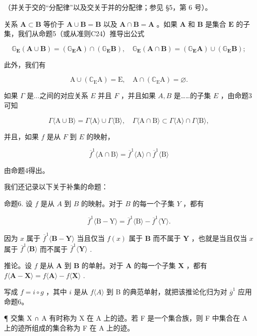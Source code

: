 （并关于交的“分配律”以及交关于并的分配律；参见 §5，第 6 号）。

关系 \(\mathbf{A} \subset \mathbf{B}\) 等价于 \(\mathbf{A} \cup \mathbf{B} = \mathbf{B}\) 以及 \(\mathbf{A} \cap \mathbf{B} = \mathbf{A}\) 。如果 \(\mathbf{A}\) 和 \(\mathbf{B}\) 是集合 \(\mathbf{E}\) 的子集，我们从命题5（或从准则C24）推导出公式

\[
\mathbb {G} _ {\mathbf {E}} (\mathbf {A} \cup \mathbf {B}) = \left(\mathbb {G} _ {\mathbf {E}} \mathbf {A}\right) \cap \left(\mathbb {G} _ {\mathbf {E}} \mathbf {B}\right), \quad \mathbb {G} _ {\mathbf {E}} (\mathbf {A} \cap \mathbf {B}) = \left(\mathbb {G} _ {\mathbf {E}} \mathbf {A}\right) \cup \left(\mathbb {G} _ {\mathbf {E}} \mathbf {B}\right);
\]

此外，我们有

\[
\mathrm{A} \cup (\mathbb {C} _ {\mathrm{E}} \mathrm{A}) = \mathrm{E}, \quad \mathrm{A} \cap (\mathbb {C} _ {\mathrm{E}} \mathrm{A}) = \varnothing .
\]

如果 \(\Gamma\) 是...之间的对应关系 \(E\) 并且 \(F\) ，并且如果 \(A, B\) 是……的子集 \(E\) ，由命题3可知

\[
\Gamma \langle \mathrm{A} \cup \mathrm{B} \rangle = \Gamma \langle \mathrm{A} \rangle \cup \Gamma \langle \mathrm{B} \rangle , \quad \Gamma \langle \mathrm{A} \cap \mathrm{B} \rangle \subset \Gamma \langle \mathrm{A} \rangle \cap \Gamma \langle \mathrm{B} \rangle ,
\]

并且，如果 \(f\) 是从 \(F\) 到 \(E\) 的映射，

\[
\overline {{{f}}} ^ {1} \langle \mathrm{A} \cap \mathrm{B} \rangle = \overline {{{f}}} ^ {1} \langle \mathrm{A} \rangle \cap \overline {{{f}}} ^ {1} \langle \mathrm{B} \rangle
\]

由命题4得出。

我们还记录以下关于补集的命题：

命题6. 设 \(f\) 是从 \(A\) 到 \(B\) 的映射。对于 \(B\) 的每一个子集 \(Y\) ，都有

\[
\overline {{{f}}} ^ {1} \langle \mathrm{B} - \mathrm{Y} \rangle = \overline {{{f}}} ^ {1} \langle \mathrm{B} \rangle - \overline {{{f}}} ^ {1} \langle \mathrm{Y} \rangle .
\]

因为 \(x\) 属于 \(\overline{f}^1\langle \mathbf{B} - \mathbf{Y}\rangle\) 当且仅当 \(f(x)\) 属于 \(\mathbf{B}\) 而不属于 \(\mathbf{Y}\) ，也就是当且仅当 \(x\) 属于 \(\overline{f}^1\langle \mathbf{B}\rangle\) 而不属于 \(\overline{f}^1\langle \mathbf{Y}\rangle\) .

推论。设 \(f\) 是从 \(\mathbf{A}\) 到 \(\mathbf{B}\) 的单射。对于 \(\mathbf{A}\) 的每一个子集 \(\mathbf{X}\) ，都有 \(f\langle \mathbf{A} - \mathbf{X}\rangle = f\langle \mathbf{A}\rangle - f\langle \mathbf{X}\rangle\) .

写成 \(f = i \circ g\) ，其中 \(i\) 是从 \(f\langle A\rangle\) 到 B 的典范单射，就把该推论化归为对 \(\overline{g}^1\) 应用命题6。

¶ 交集 X ∩ A 有时称为 X 在 A 上的迹。若 F 是一个集合族，则 F 中集合在 A 上的迹所组成的集合称为 F 在 A 上的迹。

